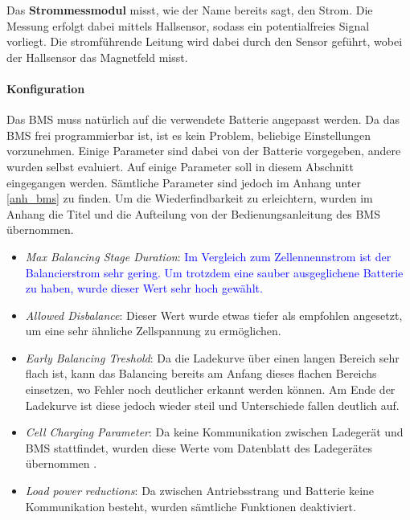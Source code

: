 Das \textbf{Strommessmodul} misst, wie der Name bereits sagt, den Strom. Die Messung erfolgt dabei mittels Hallsensor, sodass ein potentialfreies Signal vorliegt. Die stromführende Leitung wird dabei durch den Sensor geführt, wobei der Hallsensor das Magnetfeld misst.

\paragraph{Konfiguration}
Das BMS muss natürlich auf die verwendete Batterie angepasst werden. Da das BMS frei programmierbar ist, ist es kein Problem, beliebige Einstellungen vorzunehmen. Einige Parameter sind dabei von der Batterie vorgegeben, andere wurden selbst evaluiert. Auf einige Parameter soll in diesem Abschnitt eingegangen werden. Sämtliche Parameter sind jedoch im Anhang unter \ref{anh_bms} zu finden. Um die Wiederfindbarkeit zu erleichtern, wurden im Anhang die Titel und die Aufteilung von der Bedienungsanleitung des BMS \cite{bms} übernommen. \begin{itemize}
	\item \textit{Max Balancing Stage Duration}: \textcolor{blue}{Im Vergleich zum Zellennennstrom ist der Balancierstrom sehr gering. Um trotzdem eine sauber ausgeglichene Batterie zu haben, wurde dieser Wert sehr hoch gewählt.}
	\item \textit{Allowed Disbalance}: Dieser Wert wurde etwas tiefer als empfohlen angesetzt, um eine sehr ähnliche Zellspannung zu ermöglichen.
	\item \textit{Early Balancing Treshold}: Da die Ladekurve über einen langen Bereich sehr flach ist, kann das Balancing bereits am Anfang dieses flachen Bereichs einsetzen, wo Fehler noch deutlicher erkannt werden können. Am Ende der Ladekurve ist diese jedoch wieder steil und Unterschiede fallen deutlich auf.
	\item \textit{Cell Charging Parameter}: Da keine Kommunikation zwischen Ladegerät und BMS stattfindet, wurden diese Werte vom Datenblatt des Ladegerätes übernommen \cite{ladegeraet}.
	\item \textit{Load power reductions}: Da zwischen Antriebsstrang und Batterie keine Kommunikation besteht, wurden sämtliche Funktionen deaktiviert.
\end{itemize}